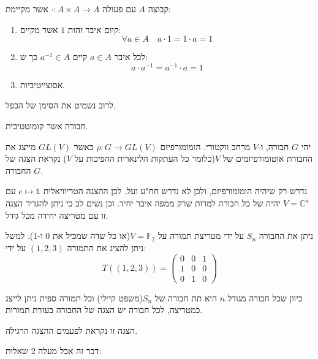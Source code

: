 \documentclass{tstextbook}
\begin{document}
\begin{definition}[חבורה]
קבוצה \(A\) עם פעולה \(\cdot:A\times A\to A\)  אשר מקיימת:

  \begin{enumerate}
    \item קיום איבר זהות \(1\) אשר מקיים: 
$$\forall a \in A\quad a \cdot 1 = 1 \cdot a = 1$$


    \item לכל איבר \(a \in A\) קיים \(a^{-1} \in A\) כך ש: 
$$a \cdot a^{-1} = a ^{-1} \cdot a = 1$$


    \item אסוצייטיביות. 


  \end{enumerate}
\end{definition}
\begin{remark}
לרוב נשמיט את הסימן של הכפל.

\end{remark}
\begin{definition}
חבורה אשר קומוטטיבית.

\end{definition}
\begin{definition}
יהי \(G\) חבורה, ו-\(V\) מרחב ווקטורי. הומומורפיזם \(\rho:G\to GL(V)\) כאשר \(GL(V)\) מייצג את החבורת אוטומורפיזמים של \(V\)(כלומר כל העתקות הלינארית ההפיכות על \(V\)) נקראת הצגה של החבורה \(G\).

\end{definition}
\begin{example}
נדרש רק שיהיה הומומורפיזם, ולכן לא נדרש חח"ע ועל. לכן ההצגה הטריוויאלית \(e\mapsto \mathbb{1}\) עם \(V=\mathbb{C}^{n}\) יהיה של כל חבורה למרות שרק ממפה איבר יחיד. וכן נשים לב כי ניתן להגדיר הצגה זו עם מטריצה יחידה מכל גודל.

\end{example}
\begin{example}
ניתן את החבורה \(S_{n}\) על ידי מטריצת תמורה על \(V=\mathbb{F} _2\)(או כל שדה שמכיל את 0 ו-1). למשל ניתן להציג את התמורה \((1,2,3)\) על ידי:
$$T((1,2,3))=\begin{pmatrix}0&0&1\\ 1&0&0\\ 0&1&0\end{pmatrix}$$

\end{example}
\begin{proposition}
כיוון שכל חבורה מגודל \(n\) היא תת חבורה של \(S_{n}\)(משפט קיילי) וכל תמורה ספית ניתן לייצג כמטריצה, לכל חבורה יש הצגה של החבורה בעזרת תמורות.

\end{proposition}
\begin{remark}
הצגה זו נקראת לפעמים ההצגה הרגילה.

\end{remark}
דבר זה אבל מעלה 2 שאלות:
\end{document}
